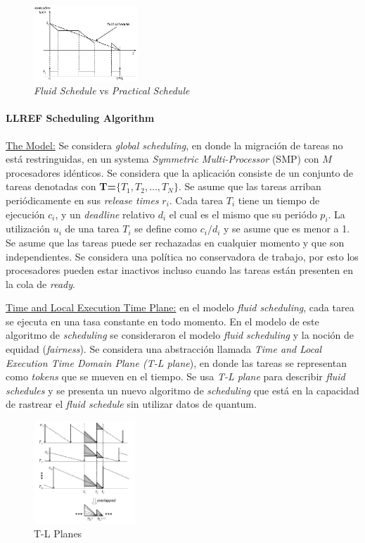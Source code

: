 \begin{figure}
    \centering
    \includegraphics[width=0.35\textwidth]{figure-1}
    \caption{\emph{Fluid Schedule} vs \emph{Practical Schedule}}
    \label{fig:figure-1}
\end{figure}

\paragraph{\textnormal{\textbf{LLREF Scheduling Algorithm}}} \underline{The Model:} Se considera \emph{global scheduling}, en donde la migración de tareas no está restringuidas,  en un systema \emph{Symmetric Multi-Processor} (SMP) con $M$ procesadores idénticos. Se considera que la aplicación consiste de un conjunto de tareas denotadas con \textbf{T=}$\{T_1, T_2, \dots, T_N\}$. Se asume que las tareas arriban periódicamente en sus \emph{release times} $r_i$. Cada tarea $T_i$ tiene un tiempo de ejecución $c_i$, y un \emph{deadline} relativo $d_i$ el cual es el mismo que su periódo $p_i$. La utilización $u_i$ de una tarea $T_i$ se define como $c_i/d_i$ y se asume que es menor a 1. Se asume que las tareas puede ser rechazadas en cualquier momento y que son independientes. Se considera una política no conservadora de trabajo, por esto los procesadores pueden estar inactivos incluso cuando las tareas están presenten en la cola de \emph{ready}.


\underline{Time and Local Execution Time Plane:} en el modelo \emph{fluid scheduling}, cada tarea se ejecuta en una tasa constante en todo momento. En el modelo de este algoritmo de \emph{scheduling} se consideraron el modelo \emph{fluid scheduling} y la noción de equidad (\emph{fairness}). Se considera una abstracción llamada \emph{Time and Local Execution Time Domain Plane (T-L plane}), en donde las tareas se representan como \emph{tokens} que se mueven en el tiempo. Se usa \emph{T-L plane} para describir \emph{fluid schedules} y se presenta un nuevo algoritmo de \emph{scheduling} que está en la capacidad de rastrear el \emph{fluid schedule} sin utilizar datos de quantum.  


\begin{figure}
    \centering
    \includegraphics[width=0.34\textwidth]{figure-2}
    \caption{T-L Planes}
    \label{fig:figure-2}
\end{figure}

